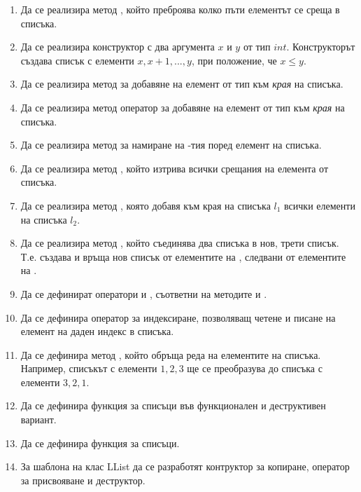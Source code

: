 \begin{enumerate}

  \item Да се реализира метод , който преброява колко пъти елементът  се среща в списъка.

  \item Да се реализира конструктор с два аргумента $x$ и $y$ от тип $int$. Конструкторът създава списък с елементи $x, x+1, ..., y$, при положение, че $x \leq y$.

  \item Да се реализира метод  за добавяне на елемент от тип  към \textit{края} на списъка.

  \item Да се реализира метод оператор  за добавяне на елемент от тип  към \textit{края} на списъка.

  \item Да се реализира метод  за намиране на -тия поред елемент на списъка.

  \item Да се реализира метод , който изтрива всички срещания на елемента  от списъка.

  \item Да се реализира метод , която добавя към края на списъка $l_1$ всички елементи на списъка $l_2$.

  \item Да се реализира метод , който съединява два списъка в нов, трети списък. Т.е.  създава и връща нов списък от елементите на , следвани от елементите на .

  \item Да се дефинират оператори  и , съответни на методите  и .

  \item Да се дефинира оператор за индексиране, позволяващ четене и писане на елемент на даден индекс в списъка.

  \item Да се дефинира метод , който обръща реда на елементите на списъка. Например, списъкът с елементи $1,2,3$ ще се преобразува до списъка с елементи $3,2,1$.

  \item Да се дефинира функция  за списъци във функционален и деструктивен вариант.

  \item Да се дефинира функция  за списъци.

  \item За шаблона на клас  LList да се разработят контруктор за копиране, оператор за присвояване и деструктор. 


\end{enumerate}

